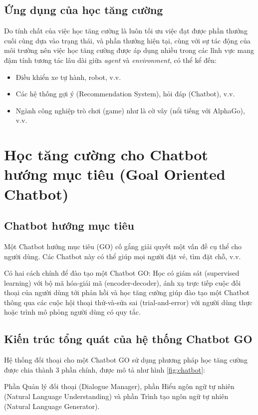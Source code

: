 \subsection{Ứng dụng của học tăng cường}
Do tính chất của việc học tăng cường là luôn tối ưu việc đạt được
phần thưởng cuối cùng dựa vào trạng thái, và phần thưởng hiện tại,
cùng với sự tác động của môi trường nên việc học tăng cường được
áp dụng nhiều trong các lĩnh vực mang đậm tính tương tác lâu dài
giữa \textit{agent} và \textit{environment}, có thể kể đến:

\begin{itemize}
    \item Điều khiển xe tự hành, robot, v.v.
    \item Các hệ thống gợi ý (Recommendation System),
    hỏi đáp (Chatbot), v.v.
    \item Ngành công nghiệp trò chơi (game) như là cờ vây
    (nổi tiếng với AlphaGo), v.v.
\end{itemize}

\section{Học tăng cường cho Chatbot hướng mục tiêu
(Goal Ori\-ented Chatbot)}

\subsection{Chatbot hướng mục tiêu}
\label{subsec:chatbotgo}
Một Chatbot hướng mục tiêu (GO) \cite{traininggochatbot} cố gắng
giải quyết một vấn đề cụ thể cho người dùng. Các Chatbot này
có thể giúp mọi người đặt vé, tìm đặt chỗ, v.v.

Có hai cách chính để đào tạo một Chatbot GO: Học có giám sát
(supervised learning) với bộ mã hóa-giải mã (encoder-decoder),
ánh xạ trực tiếp cuộc đối thoại của người dùng tới phản hồi và
học tăng cường giúp đào tạo một Chatbot thông qua các cuộc
hội thoại thử-và-sửa sai (trial-and-error) với người dùng thực
hoặc trình mô phỏng người dùng có quy tắc.

\subsection{Kiến trúc tổng quát của hệ thống Chatbot GO}
Hệ thống đối thoại cho một Chatbot GO sử dụng phương pháp
học tăng cường được chia thành 3 phần chính, được mô tả như
hình \ref{fig:chatbot}:

Phần Quản lý đối thoại (Dialogue Manager),
phần Hiểu ngôn ngữ tự nhiên (Natural Language Understanding) và
phần Trình tạo ngôn ngữ tự nhiên (Natural Language Generator).


